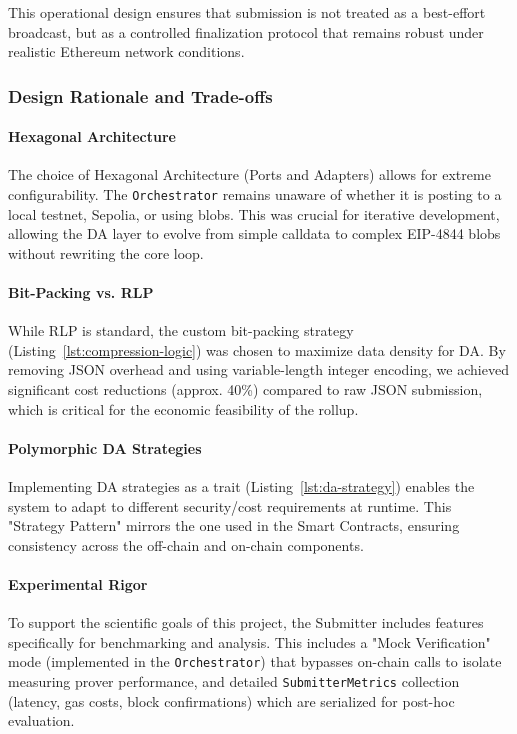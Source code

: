 This operational design ensures that submission is not treated as a best-effort broadcast, but as a controlled finalization protocol that remains robust under realistic Ethereum network conditions.

\subsubsection{Design Rationale and Trade-offs}

\paragraph{Hexagonal Architecture}
The choice of Hexagonal Architecture (Ports and Adapters) allows for extreme configurability. The \texttt{Orchestrator} remains unaware of whether it is posting to a local testnet, Sepolia, or using blobs. This was crucial for iterative development, allowing the DA layer to evolve from simple calldata to complex EIP-4844 blobs without rewriting the core loop.

\paragraph{Bit-Packing vs. RLP}
While RLP is standard, the custom bit-packing strategy (Listing~\ref{lst:compression-logic}) was chosen to maximize data density for DA. By removing JSON overhead and using variable-length integer encoding, we achieved significant cost reductions (approx. 40\%) compared to raw JSON submission, which is critical for the economic feasibility of the rollup.

\paragraph{Polymorphic DA Strategies}
Implementing DA strategies as a trait (Listing~\ref{lst:da-strategy}) enables the system to adapt to different security/cost requirements at runtime. This "Strategy Pattern" mirrors the one used in the Smart Contracts, ensuring consistency across the off-chain and on-chain components.

\paragraph{Experimental Rigor}
To support the scientific goals of this project, the Submitter includes features specifically for benchmarking and analysis. This includes a "Mock Verification" mode (implemented in the \texttt{Orchestrator}) that bypasses on-chain calls to isolate measuring prover performance, and detailed \texttt{SubmitterMetrics} collection (latency, gas costs, block confirmations) which are serialized for post-hoc evaluation.

